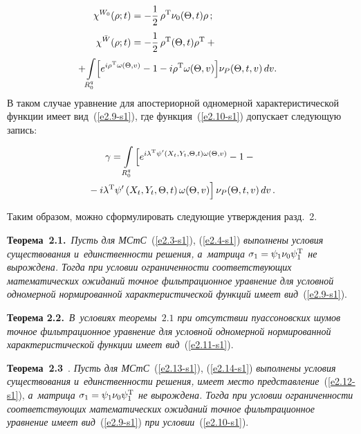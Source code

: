 \begin{multicols}{2}
\noindent
\begin{align}
\chi^{W_0} (\rho; t) &= -\fr{1}{2}\, \rho^{\mathrm{T}} \nu_0  (\Theta, t) \rho\,;\notag
\\
\chi^{\bar W} (\rho;t) &= - \fr{1}{2}\,\rho^{\mathrm{T}}  (\Theta, t) 
\rho^{\mathrm{T}}+ {}\notag\\
&\hspace*{-20mm}{}+\!\iii_{R_0^q} \!\lk e^{i\rho^{\mathrm{T}} \omega (\Theta, v)} 
-1- i\rho^{\mathrm{T}} \omega (\Theta, v)\rk \!\nu_P  (\Theta, t,v)\,dv.
\label{e2.16-s1}\!\!\!\!\!
\end{align}
В таком случае уравнение для апостериорной одномерной характеристической 
функции имеет вид~(\ref{e2.9-s1}), где функция~(\ref{e2.10-s1}) допускает 
следующую запись:

\noindent
   \begin{multline*}
    \gamma = \iii_{R_0^q} \left[ e^{ i\la^{\mathrm{T}} \psi' 
    \left(X_t, Y_t, \Theta, t\right)
    \omega(\Theta, v)} - 1- {}\right.\\
\left.    {}-i\la^{\mathrm{T}} 
    \psi'\left(X_t, Y_t, \Theta, t\right)
    \omega (\Theta, v)
    \vphantom{e^{ i\la^{\mathrm{T}}}}
    \right]
    \nu_P  (\Theta, t,v)\,dv\,.
   \end{multline*}
   
   \pagebreak

Таким образом, можно сформулировать следующие утверждения разд.~2.

\smallskip

\noindent
\textbf{Теорема~2.1.}\ \textit{Пусть для МСтС}~(\ref{e2.3-s1}), 
(\ref{e2.4-s1}) \textit{выполнены условия существования и~единственности решения, 
а~мат\-ри\-ца  $\si_1 \hm= \psi_1 \nu_0 \psi_1^{\mathrm{T}}$ не вырождена. 
Тогда при условии ограниченности соответствующих математических ожиданий точное 
фильтрационное уравнение для условной одномерной нормированной характеристической 
функций имеет вид}~(\ref{e2.9-s1}).

\smallskip

\noindent
\textbf{Теорема 2.2.}\ \textit{В~условиях теоремы~$2.1$ при отсутствии пуассоновских 
шумов точное фильтрационное уравнение для условной одномерной нормированной 
характеристической функции имеет вид}~(\ref{e2.11-s1}).


\smallskip

\noindent
\textbf{Теорема~2.3}~\cite{8-s1, 9-s1}. \textit{Пусть для МСтС}~(\ref{e2.13-s1}), 
(\ref{e2.14-s1}) \textit{выполнены условия существования и~единственности решения, 
имеет место представление}~(\ref{e2.12-s1}), 
\textit{а~мат\-ри\-ца  $\si_1 \hm= \psi_1 \nu_0 \psi_1^{\mathrm{T}}$ не вырождена. 
Тогда при условии ограниченности соответствующих математических ожиданий точное 
фильтрационное уравнение  имеет вид}~(\ref{e2.9-s1}) 
\textit{при условии}~(\ref{e2.10-s1}).


\end{multicols}
